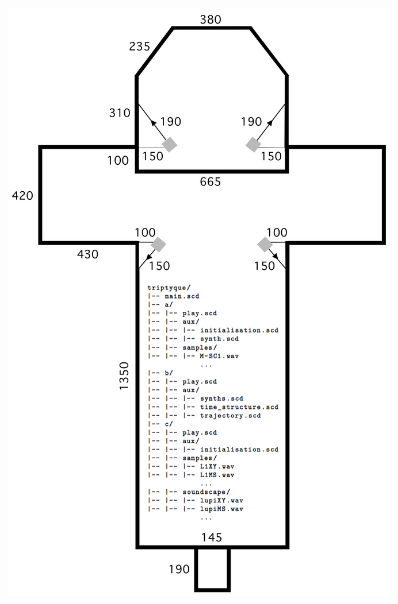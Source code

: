  \begin{figure}[H]
\begin{center}
\includegraphics[width=0.9\textwidth]{img/4361.png}
\end{center}
\end{figure}


